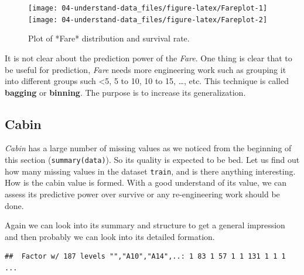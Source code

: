 \documentclass[
]{book}
\newenvironment{Shaded}{\begin{snugshade}}{\end{snugshade}}
\newcommand{\CommentTok}[1]{\textcolor[rgb]{0.56,0.35,0.01}{\textit{#1}}}
\newcommand{\KeywordTok}[1]{\textcolor[rgb]{0.13,0.29,0.53}{\textbf{#1}}}
\newcommand{\NormalTok}[1]{#1}
\newcommand{\OperatorTok}[1]{\textcolor[rgb]{0.81,0.36,0.00}{\textbf{#1}}}
\begin{document}
\begin{figure}

{\centering \texttt{[image: 04-understand-data\_files/figure-latex/Fareplot-1]} \texttt{[image: 04-understand-data\_files/figure-latex/Fareplot-2]} 

}

\caption{Plot of *Fare* distribution and survival rate.}\label{fig:Fareplot}
\end{figure}

It is not clear about the prediction power of the \emph{Fare}. One thing is clear that to be useful for prediction, \emph{Fare} needs more engineering work such as grouping it into different groups such \textless5, 5 to 10, 10 to 15, \ldots, etc. This technique is called \textbf{bagging} or \textbf{binning}. The purpose is to increase its generalization.

\hypertarget{cabin}{%
\subsection*{Cabin}\label{cabin}}


\emph{Cabin} has a large number of missing values as we noticed from the beginning of this section (\texttt{summary(data)}). So its quality is expected to be bed. Let us find out how many missing values in the dataset \texttt{train}, and is there anything interesting. How is the cabin value is formed. With a good understand of its value, we can assess its predictive power over survive or any re-engineering work should be done.

Again we can look into its summary and structure to get a general impression and then probably we can look into its detailed formation.

\begin{Shaded}
\end{Shaded}

\begin{verbatim}
##  Factor w/ 187 levels "","A10","A14",..: 1 83 1 57 1 1 131 1 1 1 ...
\end{verbatim}

\begin{Shaded}
\end{Shaded}
\end{document}
